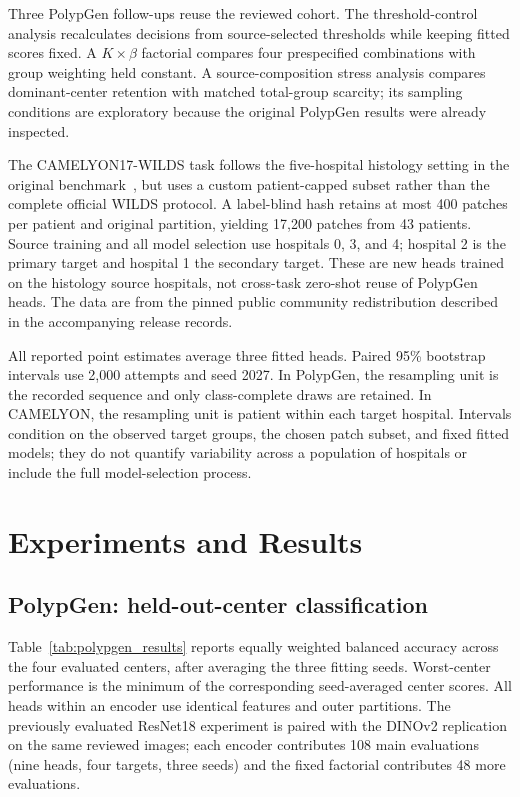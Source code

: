 Three PolypGen follow-ups reuse the reviewed cohort. The threshold-control analysis recalculates decisions from source-selected thresholds while keeping fitted scores fixed. A $K\times\beta$ factorial compares four prespecified combinations with group weighting held constant. A source-composition stress analysis compares dominant-center retention with matched total-group scarcity; its sampling conditions are exploratory because the original PolypGen results were already inspected.

The CAMELYON17-WILDS task follows the five-hospital histology setting in the original benchmark~\cite{bandi2019camelyon,koh2021wilds}, but uses a custom patient-capped subset rather than the complete official WILDS protocol. A label-blind hash retains at most 400 patches per patient and original partition, yielding 17,200 patches from 43 patients. Source training and all model selection use hospitals 0, 3, and 4; hospital 2 is the primary target and hospital 1 the secondary target. These are new heads trained on the histology source hospitals, not cross-task zero-shot reuse of PolypGen heads. The data are from the pinned public community redistribution described in the accompanying release records.

All reported point estimates average three fitted heads. Paired 95\% bootstrap intervals use 2,000 attempts and seed 2027. In PolypGen, the resampling unit is the recorded sequence and only class-complete draws are retained. In CAMELYON, the resampling unit is patient within each target hospital. Intervals condition on the observed target groups, the chosen patch subset, and fixed fitted models; they do not quantify variability across a population of hospitals or include the full model-selection process.

\section{Experiments and Results}
\label{sec:results}

\subsection{PolypGen: held-out-center classification}
Table~\ref{tab:polypgen_results} reports equally weighted balanced accuracy across the four evaluated centers, after averaging the three fitting seeds. Worst-center performance is the minimum of the corresponding seed-averaged center scores. All heads within an encoder use identical features and outer partitions. The previously evaluated ResNet18 experiment is paired with the DINOv2 replication on the same reviewed images; each encoder contributes 108 main evaluations (nine heads, four targets, three seeds) and the fixed factorial contributes 48 more evaluations.

